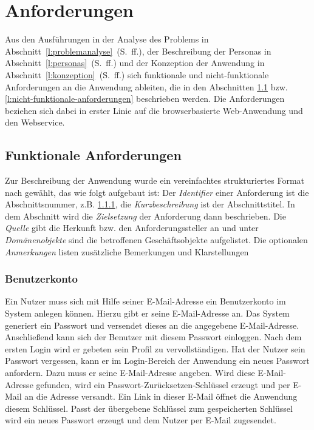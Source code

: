 \section{Anforderungen}\label{l:anforderungen}

Aus den Ausführungen in der Analyse des Problems in Abschnitt~\ref{l:problemanalyse}~(S.\pageref{l:problemanalyse}~ff.), der Beschreibung der Personas in Abschnitt~\ref{l:personas}~(S.\pageref{l:personas}~ff.) und der Konzeption der Anwendung in Abschnitt~\ref{l:konzeption}~(S.\pageref{l:konzeption}~ff.) sich funktionale und nicht-funktionale Anforderungen an die Anwendung ableiten, die in den Abschnitten \ref{l:funktionale-anforderungen} bzw. \ref{l:nicht-funktionale-anforderungen} beschrieben werden. Die Anforderungen beziehen sich dabei in erster Linie auf die browserbasierte Web-Anwendung und den Webservice. 

\subsection{Funktionale Anforderungen}\label{l:funktionale-anforderungen}

Zur Beschreibung der Anwendung wurde ein vereinfachtes strukturiertes Format nach \cite[S.151~ff.]{schienmann2002kontinuierliches} gewählt, das wie folgt aufgebaut ist: Der \emph{Identifier} einer Anforderung ist die Abschnittsnummer, z.B. \ref{anforderung:registrierung},  die \emph{Kurzbeschreibung} ist der Abschnittstitel. In dem Abschnitt wird die \emph{Zielsetzung} der Anforderung dann beschrieben. Die \emph{Quelle} gibt die Herkunft bzw. den Anforderungssteller an und unter \emph{Domänenobjekte} sind die betroffenen Geschäftsobjekte aufgelistet. Die optionalen \emph{Anmerkungen} listen zusätzliche Bemerkungen und Klarstellungen

\subsubsection{Benutzerkonto}\label{anforderung:registrierung}

Ein Nutzer muss sich mit Hilfe seiner E-Mail-Adresse ein Benutzerkonto im System anlegen können. Hierzu gibt er seine E-Mail-Adresse an. Das System generiert ein Passwort und versendet dieses an die angegebene E-Mail-Adresse. Anschließend kann sich der Benutzer mit diesem Passwort einloggen. Nach dem ersten Login wird er gebeten sein Profil zu vervollständigen. Hat der Nutzer sein Passwort vergessen, kann er im Login-Bereich der Anwendung ein neues Passwort anfordern. Dazu muss er seine E-Mail-Adresse angeben. Wird diese E-Mail-Adresse gefunden, wird ein Passwort-Zurücksetzen-Schlüssel erzeugt und per E-Mail an die Adresse versandt. Ein Link in dieser E-Mail öffnet die Anwendung diesem Schlüssel. Passt der übergebene Schlüssel zum gespeicherten Schlüssel wird ein neues Passwort erzeugt und dem Nutzer per E-Mail zugesendet.

